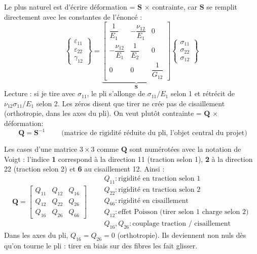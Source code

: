 \documentclass[11pt,a4paper]{article}
\newcommand{\Q}{\mathbf{Q}}
\newcommand{\Sm}{\mathbf{S}}
\begin{document}
Le plus naturel est d'écrire \og déformation = $\Sm$ $\times$ contrainte\fg,
car $\Sm$ se remplit directement avec les constantes de l'énoncé :
\[
\begin{Bmatrix}\varepsilon_{11}\\ \varepsilon_{22}\\ \gamma_{12}\end{Bmatrix}
=
\underbrace{\begin{bmatrix}
 \dfrac{1}{E_1} & -\dfrac{\nu_{12}}{E_1} & 0\\[1.2ex]
 -\dfrac{\nu_{12}}{E_1} & \dfrac{1}{E_2} & 0\\[1.2ex]
 0 & 0 & \dfrac{1}{G_{12}}
\end{bmatrix}}_{\Sm}
\begin{Bmatrix}\sigma_{11}\\ \sigma_{22}\\ \sigma_{12}\end{Bmatrix}
\]
Lecture : si je tire avec $\sigma_{11}$, le pli s'allonge de
$\sigma_{11}/E_1$ selon 1 et rétrécit de $\nu_{12}\sigma_{11}/E_1$ selon 2.
Les zéros disent que tirer ne crée pas de cisaillement (orthotropie, dans les
axes du pli). On veut plutôt \og contrainte = $\Q$ $\times$ déformation\fg :
\[
\boxed{\;\Q = \Sm^{-1}\;}
\qquad\text{(matrice de rigidité réduite du pli, l'objet central du projet)}
\]

\begin{idee}
Les cases d'une matrice $3\times3$ comme $\Q$ sont numérotées avec la
\og notation de Voigt\fg{} : l'indice \textbf{1} correspond à la direction
11 (traction selon 1), \textbf{2} à la direction 22 (traction selon 2) et
\textbf{6} au cisaillement 12. Ainsi :
\[
\Q =
\begin{bmatrix}
Q_{11} & Q_{12} & Q_{16}\\
Q_{12} & Q_{22} & Q_{26}\\
Q_{16} & Q_{26} & Q_{66}
\end{bmatrix}
\qquad
\begin{array}{l}
Q_{11} : \text{rigidité en traction selon 1}\\
Q_{22} : \text{rigidité en traction selon 2}\\
Q_{66} : \text{rigidité en cisaillement}\\
Q_{12} : \text{effet Poisson (tirer selon 1 charge selon 2)}\\
Q_{16}, Q_{26} : \text{couplage traction / cisaillement}
\end{array}
\]
Dans les axes du pli, $Q_{16} = Q_{26} = 0$ (orthotropie). Ils deviennent
non nuls dès qu'on tourne le pli : tirer en biais sur des fibres les fait
\og glisser\fg.
\end{idee}
\end{document}
